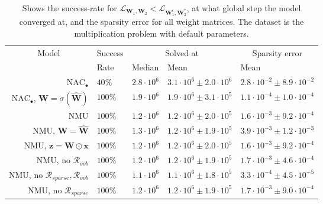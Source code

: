 \begin{table}[!h]

\caption{\label{tab:function-task-static-ablation}Shows the success-rate for $\mathcal{L}_{\mathbf{W}_1, \mathbf{W}_2} < \mathcal{L}_{\mathbf{W}_1^\epsilon, \mathbf{W}_2^*}$, at what global step the model converged at, and the sparsity error for all weight matrices. The dataset is the multiplication problem with default parameters.}
\centering
\begin{tabular}{rllll}
\toprule
\multicolumn{1}{c}{Model} & \multicolumn{1}{c}{Success} & \multicolumn{2}{c}{Solved at} & \multicolumn{1}{c}{Sparsity error} \\
\cmidrule(l{3pt}r{3pt}){1-1} \cmidrule(l{3pt}r{3pt}){2-2} \cmidrule(l{3pt}r{3pt}){3-4} \cmidrule(l{3pt}r{3pt}){5-5}
 & Rate & Median & Mean & Mean\\
\midrule
$\mathrm{NAC}_{\bullet}$ & $40\%$ & $2.8 \cdot 10^{6}$ & $3.1 \cdot 10^{6} \pm 2.0 \cdot 10^{6}$ & $2.8 \cdot 10^{-2} \pm 8.9 \cdot 10^{-2}$\\

$\mathrm{NAC}_{\bullet}$, $\mathbf{W} = \sigma(\mathbf{\hat{W}})$ & $100\%$ & $1.9 \cdot 10^{6}$ & $1.9 \cdot 10^{6} \pm 3.1 \cdot 10^{5}$ & $1.1 \cdot 10^{-4} \pm 1.0 \cdot 10^{-4}$\\

NMU & $100\%$ & $1.2 \cdot 10^{6}$ & $1.2 \cdot 10^{6} \pm 2.0 \cdot 10^{5}$ & $1.6 \cdot 10^{-3} \pm 9.2 \cdot 10^{-4}$\\

NMU, $\mathbf{W} = \mathbf{\hat{W}}$ & $100\%$ & $1.3 \cdot 10^{6}$ & $1.2 \cdot 10^{6} \pm 1.9 \cdot 10^{5}$ & $3.9 \cdot 10^{-3} \pm 1.2 \cdot 10^{-3}$\\

NMU, $\mathbf{z} = \mathbf{W} \odot \mathbf{x}$ & $100\%$ & $1.2 \cdot 10^{6}$ & $1.2 \cdot 10^{6} \pm 2.0 \cdot 10^{5}$ & $1.6 \cdot 10^{-3} \pm 9.2 \cdot 10^{-4}$\\

NMU, no $\mathcal{R}_{oob}$ & $100\%$ & $1.2 \cdot 10^{6}$ & $1.2 \cdot 10^{6} \pm 1.9 \cdot 10^{5}$ & $1.7 \cdot 10^{-3} \pm 4.6 \cdot 10^{-4}$\\

NMU, no $\mathcal{R}_{sparse},\mathcal{R}_{oob}$ & $100\%$ & $1.1 \cdot 10^{6}$ & $1.1 \cdot 10^{6} \pm 1.8 \cdot 10^{5}$ & $3.3 \cdot 10^{-4} \pm 4.5 \cdot 10^{-5}$\\

NMU, no $\mathcal{R}_{sparse}$ & $100\%$ & $1.2 \cdot 10^{6}$ & $1.2 \cdot 10^{6} \pm 1.9 \cdot 10^{5}$ & $1.7 \cdot 10^{-3} \pm 9.0 \cdot 10^{-4}$\\
\bottomrule
\end{tabular}
\end{table}
